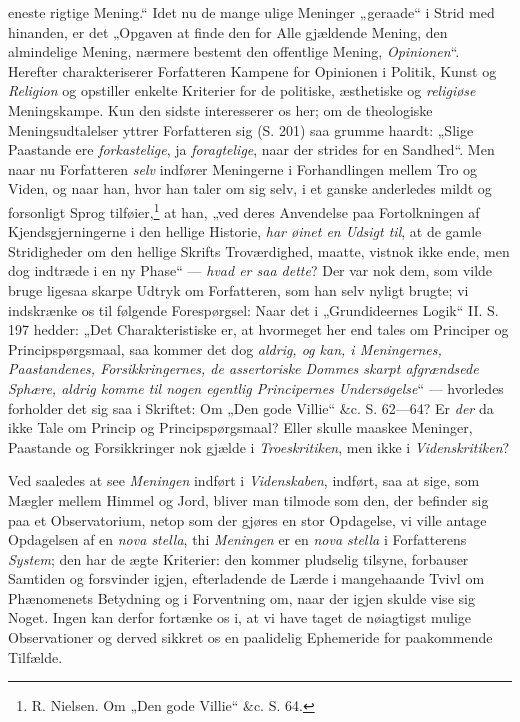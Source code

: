 \documentclass[12pt,a4paper]{book}
\newcommand{\opage}[1]{\marginnote{\footnotesize\textit{[#1]}}}
\begin{document}
eneste rigtige Mening.“ Idet nu de mange ulige Meninger
„geraade“ i Strid med hinanden, er det „Opgaven
at finde den for Alle gjældende Mening, den almindelige
Mening, nærmere bestemt den offentlige Mening, \emph{Opinionen}“.
Herefter charakteriserer Forfatteren Kampene
for Opinionen i Politik, Kunst og \emph{Religion} og opstiller
enkelte Kriterier for de politiske, æsthetiske og \emph{religiøse}
Meningskampe. Kun den sidste interesserer os her; om de
theologiske Meningsudtalelser yttrer Forfatteren sig (S. 201)
saa grumme haardt: „Slige Paastande ere \emph{forkastelige},
ja \emph{foragtelige}, naar der strides for en Sandhed“.
Men naar nu Forfatteren \emph{selv} indfører Meningerne i
Forhandlingen mellem Tro og Viden, og naar han,
hvor han taler om sig selv, i et ganske anderledes mildt
og forsonligt Sprog tilføier,\footnote{R. Nielsen. Om „Den gode Villie“ \&c. S. 64.} at han, „ved deres Anvendelse
paa Fortolkningen af Kjendsgjerningerne i den
hellige Historie, \emph{har øinet en Udsigt til}, at de
gamle Stridigheder om den hellige Skrifts Troværdighed,
maatte, vistnok ikke ende, men dog indtræde i en ny
\opage{86}\setcounter{footnote}{0}%
Phase“ --- \emph{hvad er saa dette}? Der var nok dem,
som vilde bruge ligesaa skarpe Udtryk om Forfatteren,
som han selv nyligt brugte; vi indskrænke os til følgende
Forespørgsel: Naar det i „Grundideernes Logik“ II. S.
197 hedder: „Det Charakteristiske er, at hvormeget her
end tales om Principer og Principspørgsmaal, saa kommer
det dog \emph{aldrig, og kan, i Meningernes,
Paastandenes, Forsikkringernes, de assertoriske
Dommes skarpt afgrændsede Sphære,
aldrig komme til nogen egentlig Principernes
Undersøgelse}“ --- hvorledes forholder det sig saa i
Skriftet: Om „Den gode Villie“ \&c. S. 62---64? Er
\emph{der} da ikke Tale om Princip og Principspørgsmaal?
Eller skulle maaskee Meninger, Paastande og Forsikkringer
nok gjælde i \emph{Troeskritiken}, men ikke i \emph{Videnskritiken}?

Ved saaledes at see \emph{Meningen} indført i \emph{Videnskaben},
indført, saa at sige, som Mægler mellem Himmel
og Jord, bliver man tilmode som den, der befinder sig
paa et Observatorium, netop som der gjøres en stor
Opdagelse, vi ville antage Opdagelsen af en \textit{nova stella},
thi \emph{Meningen} er en \textit{nova stella} i Forfatterens \emph{System};
den har de ægte Kriterier: den kommer pludselig
tilsyne, forbauser Samtiden og forsvinder igjen, efterladende
de Lærde i mangehaande Tvivl om Phænomenets
Betydning og i Forventning om, naar der igjen skulde
vise sig Noget. Ingen kan derfor fortænke os i, at vi
have taget de nøiagtigst mulige Observationer og derved
sikkret os en paalidelig Ephemeride for paakommende
Tilfælde.
\end{document}
